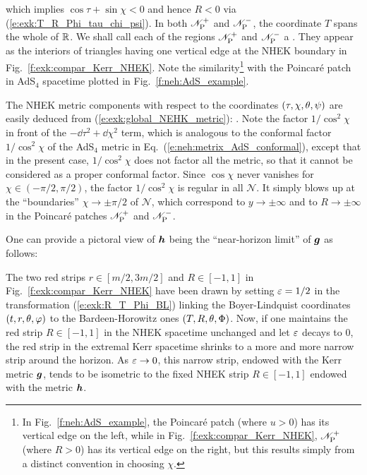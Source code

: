 which implies $\cos\tau + \sin\chi < 0$ and hence $R<0$ via (\ref{e:exk:T_R_Phi_tau_chi_psi}).
In both $\mathscr{N}_{\rm P}^+$
and $\mathscr{N}_{\rm P}^-$, the coordinate $T$ spans the whole of $\mathbb{R}$.
We shall call each of the regions $\mathscr{N}_{\rm P}^+$
and $\mathscr{N}_{\rm P}^-$  a .
They appear as the interiors of triangles having one vertical edge at the NHEK
boundary in Fig.~\ref{f:exk:compar_Kerr_NHEK}. Note the similarity\footnote{In
Fig.~\ref{f:neh:AdS_example}, the Poincaré patch (where $u>0$)
has its vertical edge on the left, while in Fig.~\ref{f:exk:compar_Kerr_NHEK},
$\mathscr{N}_{\rm P}^+$ (where $R>0$) has its vertical edge on the right, but this results simply
from a distinct convention in choosing $\chi$.}
with the Poincaré patch in AdS$_4$ spacetime plotted in Fig.~\ref{f:neh:AdS_example}.

The NHEK metric components with respect to the coordinates
$(\tau,\chi,\theta,\psi)$ are easily deduced from
(\ref{e:exk:global_NEHK_metric}):
\be
     .
\ee
Note the factor $1/\cos^2\chi$ in front of the
$- \dd \tau^2 + \dd \chi^2$ term, which is analogous to the conformal factor
$1/\cos^2\chi$ of the AdS$_4$ metric in Eq.~(\ref{e:neh:metrix_AdS_conformal}),
except that in the present case, $1/\cos^2\chi$ does not factor all the
metric, so that it cannot be considered as a proper conformal factor. Since $\cos\chi$ never vanishes
for $\chi\in(-\pi/2, \pi/2)$,
the factor $1/\cos^2\chi$ is regular in all $\mathscr{N}$. It simply blows up
at the ``boundaries'' $\chi\to \pm \pi/2$ of $\mathscr{N}$,
which correspond to $y\to \pm\infty$ and to $R\to \pm\infty$ in the Poincaré patches
$\mathscr{N}_{\rm P}^+$ and $\mathscr{N}_{\rm P}^-$.

One can provide a pictoral view of $\bm{h}$ being the ``near-horizon limit'' of $\bm{g}$ as follows:

\begin{greybox}
The two red strips $r\in[m/2, 3m/2]$ and $R\in[-1, 1]$
in Fig.~\ref{f:exk:compar_Kerr_NHEK} have been drawn by setting
$\varepsilon=1/2$ in the transformation (\ref{e:exk:R_T_Phi_BL}) linking the Boyer-Lindquist coordinates
$(t,r,\theta,\varphi)$ to the Bardeen-Horowitz ones $(T,R,\theta,\Phi)$. Now, if one maintains
the red strip $R\in[-1, 1]$ in the NHEK spacetime unchanged and let $\varepsilon$ decays to $0$,
the red strip in the extremal Kerr spacetime  shrinks to a more and more narrow strip
around the horizon. As $\varepsilon\to 0$, this narrow strip, endowed with the Kerr metric $\bm{g}$, tends
to be isometric to the fixed NHEK strip $R\in[-1, 1]$ endowed with the metric $\bm{h}$.
\end{greybox}

